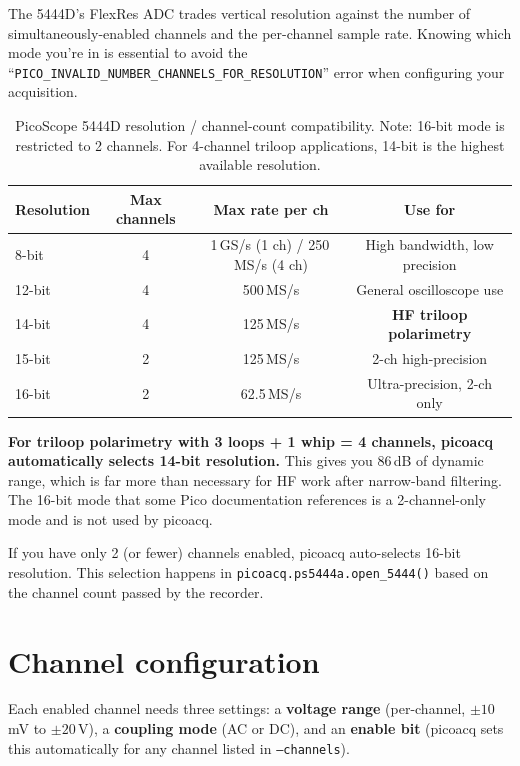 \documentclass[11pt]{article}
\begin{document}
The 5444D's FlexRes ADC trades vertical resolution against the number
of simultaneously-enabled channels and the per-channel sample rate.
Knowing which mode you're in is essential to avoid the
``\texttt{PICO\_INVALID\_NUMBER\_CHANNELS\_FOR\_RESOLUTION}'' error
when configuring your acquisition.

\begin{table}[h]
\centering
\begin{tabular}{lccc}
\toprule
\textbf{Resolution} & \textbf{Max channels} & \textbf{Max rate per ch} & \textbf{Use for} \\
\midrule
8-bit & 4 & 1\,GS/s (1 ch) / 250\,MS/s (4 ch) & High bandwidth, low precision \\
12-bit & 4 & 500\,MS/s & General oscilloscope use \\
14-bit & 4 & 125\,MS/s & \textbf{HF triloop polarimetry} \\
15-bit & 2 & 125\,MS/s & 2-ch high-precision \\
16-bit & 2 & 62.5\,MS/s & Ultra-precision, 2-ch only \\
\bottomrule
\end{tabular}
\caption{PicoScope 5444D resolution / channel-count compatibility.
Note: 16-bit mode is restricted to 2 channels.  For
4-channel triloop applications, 14-bit is the highest available
resolution.}
\label{tab:resolution}
\end{table}

\textbf{For triloop polarimetry with 3 loops + 1 whip = 4 channels,
\textsf{picoacq} automatically selects 14-bit resolution.}  This gives
you 86\,dB of dynamic range, which is far more than necessary for HF
work after narrow-band filtering.  The 16-bit mode that some Pico
documentation references is a 2-channel-only mode and is not used by
\textsf{picoacq}.

If you have only 2 (or fewer) channels enabled, \textsf{picoacq}
auto-selects 16-bit resolution.  This selection happens in
\texttt{picoacq.ps5444a.open\_5444()} based on the channel count
passed by the recorder.

\section{Channel configuration}
\label{sec:channels}

Each enabled channel needs three settings: a \textbf{voltage range}
(per-channel, $\pm 10$\,mV to $\pm 20$\,V), a \textbf{coupling mode}
(AC or DC), and an \textbf{enable bit} (\textsf{picoacq} sets this
automatically for any channel listed in \texttt{--channels}).
\end{document}
